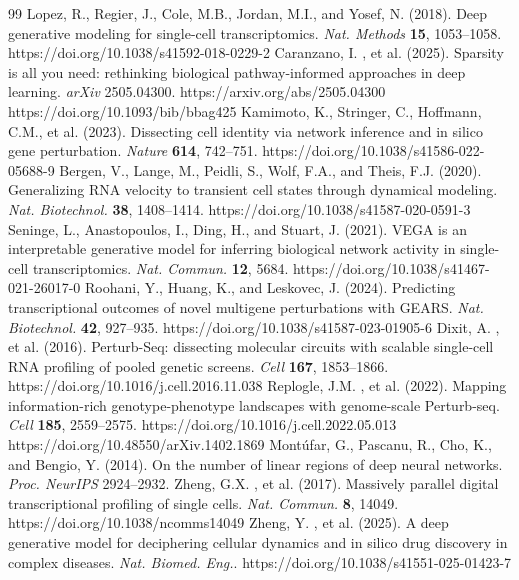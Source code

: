 \documentclass[11 pt,a4 paper]{article}
\begin{document}
\begin{thebibliography}{99}
 Lopez, R., Regier, J., Cole, M.B., Jordan, M.I., and Yosef, N. (2018). Deep generative modeling for single-cell transcriptomics. \textit{Nat. Methods} \textbf{15}, 1053--1058. https://doi.org/10.1038/s41592-018-0229-2
 Caranzano, I. , et al. (2025). Sparsity is all you need: rethinking biological pathway-informed approaches in deep learning. \textit{arXiv} 2505.04300. https://arxiv.org/abs/2505.04300 https://doi.org/10.1093/bib/bbag425
 Kamimoto, K., Stringer, C., Hoffmann, C.M., et al. (2023). Dissecting cell identity via network inference and in silico gene perturbation. \textit{Nature} \textbf{614}, 742--751. https://doi.org/10.1038/s41586-022-05688-9
 Bergen, V., Lange, M., Peidli, S., Wolf, F.A., and Theis, F.J. (2020). Generalizing RNA velocity to transient cell states through dynamical modeling. \textit{Nat. Biotechnol.} \textbf{38}, 1408--1414. https://doi.org/10.1038/s41587-020-0591-3
 Seninge, L., Anastopoulos, I., Ding, H., and Stuart, J. (2021). VEGA is an interpretable generative model for inferring biological network activity in single-cell transcriptomics. \textit{Nat. Commun.} \textbf{12}, 5684. https://doi.org/10.1038/s41467-021-26017-0
 Roohani, Y., Huang, K., and Leskovec, J. (2024). Predicting transcriptional outcomes of novel multigene perturbations with GEARS. \textit{Nat. Biotechnol.} \textbf{42}, 927--935. https://doi.org/10.1038/s41587-023-01905-6
 Dixit, A. , et al. (2016). Perturb-Seq: dissecting molecular circuits with scalable single-cell RNA profiling of pooled genetic screens. \textit{Cell} \textbf{167}, 1853--1866. https://doi.org/10.1016/j.cell.2016.11.038
 Replogle, J.M. , et al. (2022). Mapping information-rich genotype-phenotype landscapes with genome-scale Perturb-seq. \textit{Cell} \textbf{185}, 2559--2575. https://doi.org/10.1016/j.cell.2022.05.013
 https://doi.org/10.48550/arXiv.1402.1869 Mont\'{u}far, G., Pascanu, R., Cho, K., and Bengio, Y. (2014). On the number of linear regions of deep neural networks. \textit{Proc. NeurIPS} 2924--2932.
 Zheng, G.X. , et al. (2017). Massively parallel digital transcriptional profiling of single cells. \textit{Nat. Commun.} \textbf{8}, 14049. https://doi.org/10.1038/ncomms14049
 Zheng, Y. , et al. (2025). A deep generative model for deciphering cellular dynamics and in silico drug discovery in complex diseases. \textit{Nat. Biomed. Eng.}. https://doi.org/10.1038/s41551-025-01423-7

\end{thebibliography}
\end{document}
